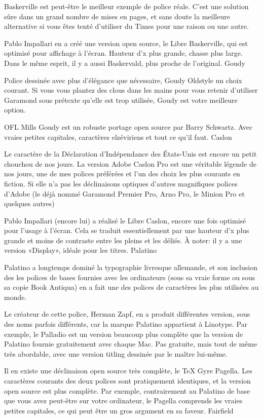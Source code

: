 \documentclass[12pt,a4paper,twocolumn]{book} %
\begin{document}
Baskerville est peut-être le meilleur exemple de police réale. C’est une solution sûre dans un grand nombre de mises en pages, et sans doute la meilleure alternative si vous êtes tenté d’utiliser du Times pour une raison ou une autre.

Pablo Impallari en a créé une version open source, le Libre Baskerville, qui est optimisé pour affichage à l’écran. Hauteur d’x plus grande, chasse plus large. Dans le même esprit, il y a aussi Baskervald, plus proche de l’original.
Goudy

Police dessinée avec plus d’élégance que nécessaire, Goudy Oldstyle un choix courant. Si vous vous plantez des clous dans les mains pour vous retenir d’utiliser Garamond sous prétexte qu’elle est trop utilisée, Goudy est votre meilleure option.

OFL Mills Goudy est un robuste portage open source par Barry Schwartz. Avec vraies petites capitales, caractères elzéviriens et tout ce qu’il faut.
Caslon

Le caractère de la Déclaration d’Indépendance des États-Unis est encore un petit chouchou de nos jours. La version Adobe Caslon Pro est une véritable légende de nos jours, une de mes polices préférées et l’un des choix les plus courants en fiction. Si elle n’a pas les déclinaisons optiques d’autres magnifiques polices d’Adobe (le déjà nommé Garamond Premier Pro, Arno Pro, le Minion Pro et quelques autres)

Pablo Impallari (encore lui) a réalisé le Libre Caslon, encore une fois optimisé pour l’usage à l’écran. Cela se traduit essentiellement par une hauteur d’x plus grande et moins de contraste entre les pleins et les déliés. À noter: il y a une version «Display», idéale pour les titres.
Palatino

Palatino a longtemps dominé la typographie livresque allemande, et son inclusion des les polices de bases fournies avec les ordinateurs (sous sa vraie forme ou sous sa copie Book Antiqua) en a fait une des polices de caractères les plus utilisées au monde.

Le créateur de cette police, Herman Zapf, en a produit différentes version, sous des noms parfois différents, car la marque Palatino appartient à Linotype. Par exemple, le Palladio est un version beaucoup plus complète que la version de Palatino fournie gratuitement avec chaque Mac. Pas gratuite, mais tout de même très abordable, avec une version titling dessinée par le maître lui-même.

Il en existe une déclinaison open source très complète, le TeX Gyre Pagella. Les caractères courants des deux polices sont pratiquement identiques, et la version open source est plus complète. Par exemple, contrairement au Palatino de base que vous avez peut-être sur votre ordinateur, le Pagella comprends les vraies petites capitales, ce qui peut être un gros argument en sa faveur.
Fairfield
\end{document}

